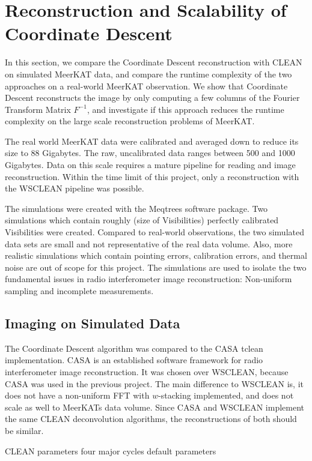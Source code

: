 \section{Reconstruction and Scalability of Coordinate Descent}
In this section, we compare the Coordinate Descent reconstruction with CLEAN on simulated MeerKAT data, and compare the runtime complexity of the two approaches on a real-world MeerKAT observation. We show that Coordinate Descent reconstructs the image by only computing a few columns of the Fourier Transform Matrix $F^{-1}$, and investigate if this approach reduces the runtime complexity on the large scale reconstruction problems of MeerKAT.

The real world MeerKAT data were calibrated and averaged down to reduce its size to 88 Gigabytes. The raw, uncalibrated data ranges between 500 and 1000 Gigabytes. Data on this scale requires a mature pipeline for reading and image reconstruction. Within the time limit of this project, only a reconstruction with the WSCLEAN\cite{offringa2014wsclean} pipeline was possible.

The simulations were created with the Meqtrees software package. Two simulations which contain roughly (size of Visibilities) perfectly calibrated Visibilities were created. Compared to real-world observations, the two simulated data sets are small and not representative of the real data volume. Also, more realistic simulations which contain pointing errors, calibration errors, and thermal noise are out of scope for this project. The simulations are used to isolate the two fundamental issues in radio interferometer image reconstruction: Non-uniform sampling and incomplete measurements.

\subsection{Imaging on Simulated Data}
The Coordinate Descent algorithm was compared to the CASA tclean implementation. CASA is an established software framework for radio interferometer image reconstruction. It was chosen over WSCLEAN, because CASA was used in the previous project. The main difference to WSCLEAN is, it does not have a non-uniform FFT with $w$-stacking implemented, and does not scale as well to MeerKATs data volume. Since CASA and WSCLEAN implement the same CLEAN deconvolution algorithms, the reconstructions of both should be similar.

CLEAN parameters
four major cycles
default parameters

